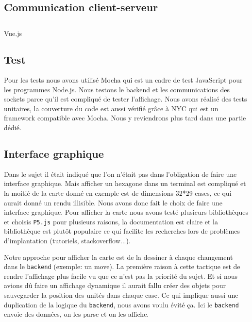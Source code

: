 \subsection{Communication client-serveur}



\subsection{}

Vue.js

\subsection{Test}

Pour les tests nous avons utilisé Mocha qui est un cadre de test JavaScript pour les programmes Node.js. Nous testons le backend et les communications des sockets parce qu'il est compliqué de tester l'affichage. Nous avons réalisé des tests unitaires, la couverture du code est aussi vérifié grâce à NYC qui est un framework compatible avec Mocha. Nous y reviendrons plus tard dans une partie dédié.

\subsection{Interface graphique}

Dans le sujet il était indiqué que l'on n'était pas dans l'obligation de faire une interface graphique. Mais afficher un hexagone dans un terminal est compliqué et la moitié de la carte donné en exemple est de dimensions 32*29 cases, ce qui aurait donné un rendu illisible. Nous avons donc fait le choix de faire une interface graphique. Pour afficher la carte nous avons testé plusieurs bibliothèques et choisis \lstinline{P5.js} pour plusieurs raisons, la documentation est claire et la bibliothèque est plutôt populaire ce qui facilite les recherches lors de problèmes d'implantation (tutoriels, stackoverflow...).

Notre approche pour afficher la carte est de la dessiner à chaque changement dans le \lstinline{backend} (exemple: un move). La première raison à cette tactique est de rendre l'affichage plus facile vu que ce n'est pas la priorité du sujet. Et si nous avions dû faire un affichage dynamique il aurait fallu créer des objets pour sauvegarder la position des unités dans chaque case. Ce qui implique aussi une duplication de la logique du \lstinline{backend}, nous avons voulu évité ça. Ici le \lstinline{backend} envoie des données, on les parse et on les affiche.


